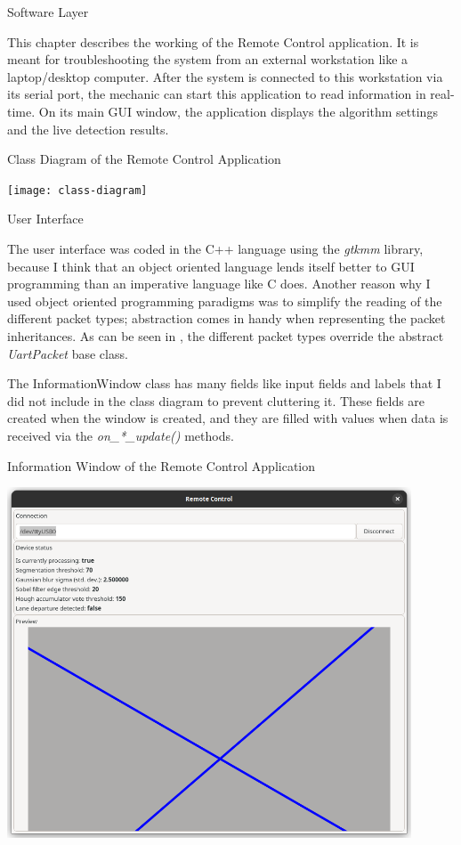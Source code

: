 \documentclass{matthijs}
\begin{document}
	\begin{hoofdstuk}{Software Layer}

		This chapter describes the working of the Remote Control application.
		It is meant for troubleshooting the system from an external workstation like a laptop/desktop computer.
		After the system is connected to this workstation via its serial port, the mechanic can start this application to read information in real-time.
		On its main GUI window, the application displays the algorithm settings and the live detection results.
		\begin{figuur}{Class Diagram of the Remote Control Application}
			\singlespacing
			\centerline{
				\texttt{[image: class-diagram]}
			}
			\onehalfspacing
		\end{figuur}

		\begin{paragraaf}{User Interface}

			The user interface was coded in the C++ language using the \textit{gtkmm} library, because I think that an object oriented language lends itself better to GUI programming than an imperative language like C does.
			Another reason why I used object oriented programming paradigms was to simplify the reading of the different packet types; abstraction comes in handy when representing the packet inheritances.
			As can be seen in , the different packet types override the abstract \textit{UartPacket} base class.

			\bigskip

			The InformationWindow class has many fields like input fields and labels that I did not include in the class diagram to prevent cluttering it.
			These fields are created when the window is created, and they are filled with values when data is received via the \textit{on\_*\_update(\textellipsis)} methods.

			\vspace{-0.5ex}
			\begin{figuur}{Information Window of the Remote Control Application}
				\singlespacing
				\centerline{
					\includegraphics[width=0.9\textwidth]{rc-gui.png}
				}
				\onehalfspacing
			\end{figuur}


\end{paragraaf}
\end{hoofdstuk}
\end{document}
